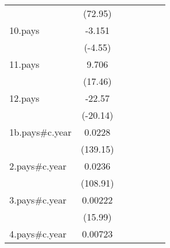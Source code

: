 {\begin{tabular}{l*{6}{c}}
                    &     (72.95)         &                     &                     &                     &                     &                     \\
[1em]
10.pays             &      -3.151\sym{***}&                     &                     &                     &                     &                     \\
                    &     (-4.55)         &                     &                     &                     &                     &                     \\
[1em]
11.pays             &       9.706\sym{***}&                     &                     &                     &                     &                     \\
                    &     (17.46)         &                     &                     &                     &                     &                     \\
[1em]
12.pays             &      -22.57\sym{***}&                     &                     &                     &                     &                     \\
                    &    (-20.14)         &                     &                     &                     &                     &                     \\
[1em]
1b.pays#c.year      &      0.0228\sym{***}&                     &                     &                     &                     &                     \\
                    &    (139.15)         &                     &                     &                     &                     &                     \\
[1em]
2.pays#c.year       &      0.0236\sym{***}&                     &                     &                     &                     &                     \\
                    &    (108.91)         &                     &                     &                     &                     &                     \\
[1em]
3.pays#c.year       &     0.00222\sym{***}&                     &                     &                     &                     &                     \\
                    &     (15.99)         &                     &                     &                     &                     &                     \\
[1em]
4.pays#c.year       &     0.00723\sym{***}&                     &                     &                     &                     &                     \\

\end{tabular}}
